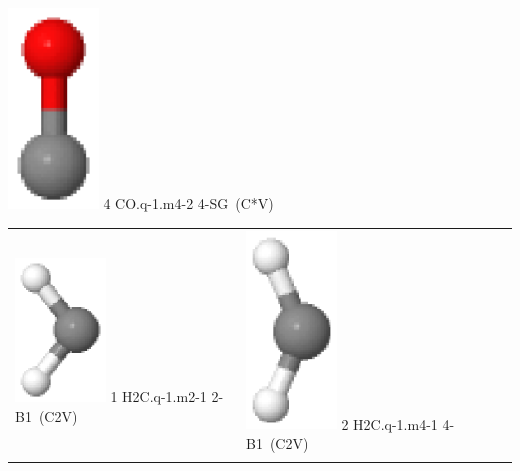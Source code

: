 \documentclass[10pt]{article}
\begin{document}
\begin{tabular}
\includegraphics[width=2.40000000000000000000cm]{CO.q-1.m4-2.eps} \tiny{4 \hspace{1.20000000000000000000cm} CO.q-1.m4-2 \hspace{5pt} 4-SG~(C*V)} 
\\
\end{tabular}

\vspace{0.5cm}
\begin{tabular}{|
>{\centering\arraybackslash}p{2.40000000000000000000cm}|
>{\centering\arraybackslash}p{2.40000000000000000000cm}|
>{\centering\arraybackslash}p{2.40000000000000000000cm}|
>{\centering\arraybackslash}p{2.40000000000000000000cm}|
>{\centering\arraybackslash}p{2.40000000000000000000cm}|
}
\hline
\multicolumn{2}{|c|}{H$_{2}$C} \\\hline
\includegraphics[width=2.40000000000000000000cm]{H2C.q-1.m2-1.eps} \tiny{1 \hspace{1.20000000000000000000cm} H2C.q-1.m2-1 \hspace{5pt} 2-B1~(C2V)} &
\includegraphics[width=2.40000000000000000000cm]{H2C.q-1.m4-1.eps} \tiny{2 \hspace{1.20000000000000000000cm} H2C.q-1.m4-1 \hspace{5pt} 4-B1~(C2V)} 
\\\cline{1-2}
\end{tabular}
\end{document}
